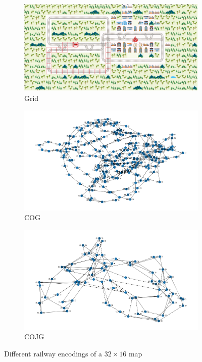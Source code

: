 \documentclass[a4paper,10pt]{report}
\begin{document}
\begin{figure}[h]
	\centering
	\captionsetup[subfigure]{justification=centering}
	\begin{subfigure}[b]{.8\linewidth}
		\includegraphics[width=\textwidth]{grid-env-32x16.png}
		\caption{Grid}
		\label{fig:grid-env-32x16}
	\end{subfigure}%

	\begin{subfigure}[b]{.8\linewidth}
		\includegraphics[width=\textwidth]{cog-env-32x16.png}
		\caption{COG}
		\label{fig:cog-env-32x16}
	\end{subfigure}%

	\begin{subfigure}[b]{.8\linewidth}
		\includegraphics[width=\textwidth]{cojg-env-32x16.png}
		\caption{COJG}
		\label{fig:cojg-env-32x16}
	\end{subfigure}%

	\caption{Different railway encodings of a $32\times 16$ map}
	\label{fig:grid-cog-cojg-32x16}
\end{figure}
\end{document}
